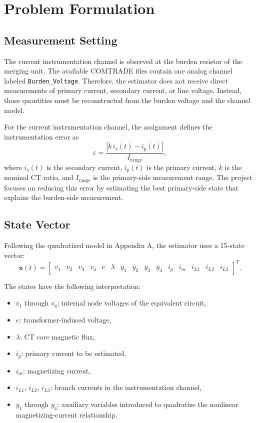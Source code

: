 \documentclass[11pt]{article}
\begin{document}
\section{Problem Formulation}
\subsection{Measurement Setting}
The current instrumentation channel is observed at the burden resistor of the merging unit. The
available COMTRADE files contain one analog channel labeled \texttt{Burden\_Voltage}. Therefore,
the estimator does not receive direct measurements of primary current, secondary current, or line
voltage. Instead, those quantities must be reconstructed from the burden voltage and the channel
model.

For the current instrumentation channel, the assignment defines the instrumentation error as
\begin{equation}
\varepsilon = \frac{\left| k\,i_s(t) - i_p(t) \right|}{I_{\text{range}}},
\end{equation}
where $i_s(t)$ is the secondary current, $i_p(t)$ is the primary current, $k$ is the nominal CT
ratio, and $I_{\text{range}}$ is the primary-side measurement range. The project focuses on
reducing this error by estimating the best primary-side state that explains the burden-side
measurement.

\subsection{State Vector}
Following the quadratized model in Appendix A, the estimator uses a 15-state vector:
\begin{equation}
\mathbf{x}(t) =
\begin{bmatrix}
v_1 & v_2 & v_3 & v_4 & e & \lambda & y_1 & y_2 & y_3 & y_4 & i_p & i_m & i_{L1} & i_{L2} & i_{L3}
\end{bmatrix}^{T}.
\end{equation}

The states have the following interpretation:
\begin{itemize}
  \item $v_1$ through $v_4$: internal node voltages of the equivalent circuit,
  \item $e$: transformer-induced voltage,
  \item $\lambda$: CT core magnetic flux,
  \item $i_p$: primary current to be estimated,
  \item $i_m$: magnetizing current,
  \item $i_{L1}$, $i_{L2}$, $i_{L3}$: branch currents in the instrumentation channel,
  \item $y_1$ through $y_4$: auxiliary variables introduced to quadratize the nonlinear
  magnetizing-current relationship.
\end{itemize}
\end{document}
